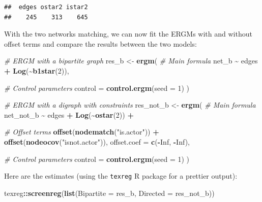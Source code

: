 \documentclass[
]{book}
\newenvironment{Shaded}{\begin{snugshade}}{\end{snugshade}}
\newcommand{\AttributeTok}[1]{\textcolor[rgb]{0.13,0.29,0.53}{#1}}
\newcommand{\CommentTok}[1]{\textcolor[rgb]{0.56,0.35,0.01}{\textit{#1}}}
\newcommand{\ConstantTok}[1]{\textcolor[rgb]{0.56,0.35,0.01}{#1}}
\newcommand{\DecValTok}[1]{\textcolor[rgb]{0.00,0.00,0.81}{#1}}
\newcommand{\FunctionTok}[1]{\textcolor[rgb]{0.13,0.29,0.53}{\textbf{#1}}}
\newcommand{\NormalTok}[1]{#1}
\newcommand{\OtherTok}[1]{\textcolor[rgb]{0.56,0.35,0.01}{#1}}
\newcommand{\SpecialCharTok}[1]{\textcolor[rgb]{0.81,0.36,0.00}{\textbf{#1}}}
\newcommand{\StringTok}[1]{\textcolor[rgb]{0.31,0.60,0.02}{#1}}
\begin{document}
\begin{verbatim}
##  edges ostar2 istar2 
##    245    313    645
\end{verbatim}

With the two networks matching, we can now fit the ERGMs with and without
offset terms and compare the results between the two models:

\begin{Shaded}
\begin{Highlighting}[]
\CommentTok{\# ERGM with a bipartite graph}
\NormalTok{res\_b     }\OtherTok{\textless{}{-}} \FunctionTok{ergm}\NormalTok{(}
  \CommentTok{\# Main formula}
\NormalTok{  net\_b }\SpecialCharTok{\textasciitilde{}}\NormalTok{ edges }\SpecialCharTok{+} \FunctionTok{Log}\NormalTok{(}\SpecialCharTok{\textasciitilde{}}\FunctionTok{b1star}\NormalTok{(}\DecValTok{2}\NormalTok{)),}

  \CommentTok{\# Control parameters}
  \AttributeTok{control =} \FunctionTok{control.ergm}\NormalTok{(}\AttributeTok{seed =} \DecValTok{1}\NormalTok{)}
\NormalTok{  )}

\CommentTok{\# ERGM with a digraph with constraints}
\NormalTok{res\_not\_b }\OtherTok{\textless{}{-}} \FunctionTok{ergm}\NormalTok{(}
  \CommentTok{\# Main formula}
\NormalTok{  net\_not\_b }\SpecialCharTok{\textasciitilde{}}\NormalTok{ edges }\SpecialCharTok{+} \FunctionTok{Log}\NormalTok{(}\SpecialCharTok{\textasciitilde{}}\FunctionTok{ostar}\NormalTok{(}\DecValTok{2}\NormalTok{)) }\SpecialCharTok{+}

  \CommentTok{\# Offset terms }
  \FunctionTok{offset}\NormalTok{(}\FunctionTok{nodematch}\NormalTok{(}\StringTok{"is.actor"}\NormalTok{)) }\SpecialCharTok{+} \FunctionTok{offset}\NormalTok{(}\FunctionTok{nodeocov}\NormalTok{(}\StringTok{"isnot.actor"}\NormalTok{)),}
  \AttributeTok{offset.coef =} \FunctionTok{c}\NormalTok{(}\SpecialCharTok{{-}}\ConstantTok{Inf}\NormalTok{, }\SpecialCharTok{{-}}\ConstantTok{Inf}\NormalTok{),}

  \CommentTok{\# Control parameters}
  \AttributeTok{control =} \FunctionTok{control.ergm}\NormalTok{(}\AttributeTok{seed =} \DecValTok{1}\NormalTok{)}
\NormalTok{  )}
\end{Highlighting}
\end{Shaded}

Here are the estimates (using the \texttt{texreg} R package for a prettier output):

\begin{Shaded}
\begin{Highlighting}[]
\NormalTok{texreg}\SpecialCharTok{::}\FunctionTok{screenreg}\NormalTok{(}\FunctionTok{list}\NormalTok{(}\AttributeTok{Bipartite =}\NormalTok{ res\_b, }\AttributeTok{Directed =}\NormalTok{ res\_not\_b))}
\end{Highlighting}
\end{Shaded}
\end{document}
